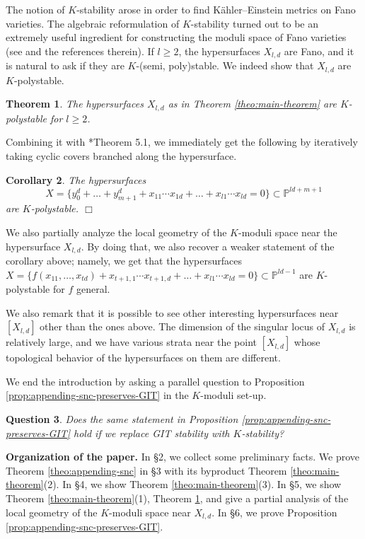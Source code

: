 \documentclass[letterpaper,11pt]{amsart}
\theoremstyle{plain}
\newtheorem{theo}{Theorem}[section]
\newtheorem{coro}[theo]{Corollary}
\newtheorem{ques}[theo]{Question}
\theoremstyle{definition}
\theoremstyle{remark}
\newcommand{\PP}{\mathbb{P}}
\begin{document}
The notion of $K$-stability arose in order to find Kähler--Einstein metrics on Fano varieties. The algebraic reformulation of $K$-stability turned out to be an extremely useful ingredient for constructing the moduli space of Fano varieties (see \cite{Xu:K-book} and the references therein). If $l \geq 2$, the hypersurfaces $X_{l,d}$ are Fano, and it is natural to ask if they are $K$-(semi, poly)stable. We indeed show that $X_{l,d}$ are $K$-polystable.

\begin{theo} \label{theo:K-polystable}
        The hypersurfaces $X_{l,d}$ as in Theorem \ref{theo:main-theorem} are $K$-polystable for $l \geq 2$.
\end{theo}

Combining it with \cite{Liu-Zhu:equivariant-K-stability-group-fini}*{Theorem 5.1}, we immediately get the following by iteratively taking cyclic covers branched along the hypersurface.
\begin{coro}
    The hypersurfaces
    $$ X = \{ y_{0}^{d} + \ldots + y_{m+1}^{d} + x_{11}\cdots x_{1d} + \ldots + x_{l1} \cdots x_{ld}= 0\} \subset \PP^{ld + m+1}$$
    are $K$-polystable. \hfill{$\Box$}
\end{coro}

We also partially analyze the local geometry of the $K$-moduli space near the hypersurface $X_{l,d}$. By doing that, we also recover a weaker statement of the corollary above; namely, we get that the hypersurfaces
$ X = \{ f(x_{11},\ldots, x_{td}) + x_{t+1,1}\cdots x_{t+1,d} + \ldots + x_{l1} \cdots x_{ld} = 0 \} \subset \PP^{ld-1} $
are $K$-polystable for $f$ general.

We also remark that it is possible to see other interesting hypersurfaces near $[X_{l,d}]$ other than the ones above. The dimension of the singular locus of $X_{l,d}$ is relatively large, and we have various strata near the point $[X_{l,d}]$ whose topological behavior of the hypersurfaces on them are different.

We end the introduction by asking a parallel question to Proposition \ref{prop:appending-snc-preserves-GIT} in the $K$-moduli set-up.

\begin{ques}
    Does the same statement in Proposition \ref{prop:appending-snc-preserves-GIT} hold if we replace GIT stability with $K$-stability?
\end{ques}

    \noindent
    \textbf{Organization of the paper.} In \S2, we collect some preliminary facts. We prove Theorem \ref{theo:appending-snc} in \S3 with its byproduct Theorem \ref{theo:main-theorem}(2). In \S4, we show Theorem \ref{theo:main-theorem}(3). In \S5, we show Theorem \ref{theo:main-theorem}(1), Theorem \ref{theo:K-polystable}, and give a partial analysis of the local geometry of the $K$-moduli space near $X_{l,d}$. In \S6, we prove Proposition \ref{prop:appending-snc-preserves-GIT}.
    
\end{document}
